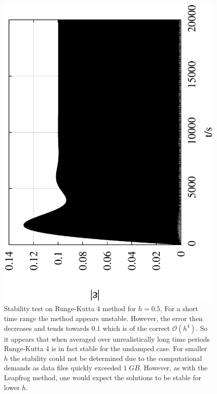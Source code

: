 \documentclass[10pt,a4paper]{article}
\begin{document}
\begin{figure}[t!]
\begin{center}
\includegraphics[scale = 0.6, angle =-90]{RungeKutta4_0.5_10000000_0VeryShort.txt.eps}
\caption{Stability test on Runge-Kutta 4 method for $h=0.5$. For a short time range the method appears unstable. However, the error then decreases and tends towards $0.1$ which is of the correct $\mathcal{O}(h^4)$. So it appears that when averaged over unrealistically long time periods Runge-Kutta 4 is in fact stable for the undamped case. For smaller $h$ the stability could not be determined due to the computational demands as data files quickly exceeded $1\;GB$. However, as with the Leapfrog method, one would expect the solutions to be stable for lower $h$.}
\label{fig:RungeStabilityUndamped}
\end{center}
\end{figure}
\end{document}
